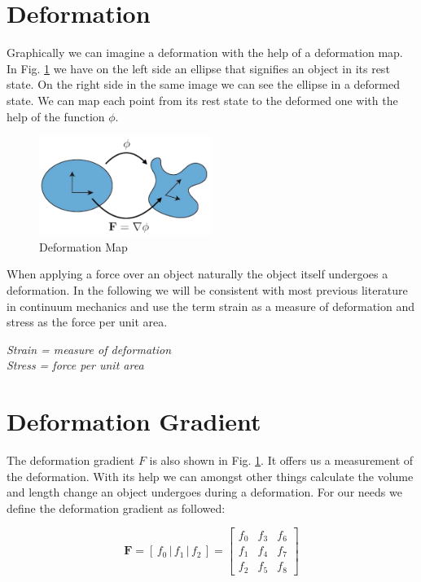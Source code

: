\section{Deformation}
Graphically we can imagine a deformation with the help of a deformation map. In Fig. \ref{fig:deformationmap} we have on the left side an ellipse that signifies an object in its rest state. On the right side in the same image we can see the ellipse in a deformed state. We can map each point from its rest state to the deformed one with the help of the function $\phi$.

\begin{figure}[!htbp]
	\centering
	\includegraphics[width=0.5\textwidth]{resources/deformation_map}
	\caption{Deformation Map {\cite{STREAM2018}}}
	\label{fig:deformationmap}
\end{figure}

When applying a force over an object naturally the object itself undergoes a deformation. In the following we will be consistent with most previous literature in continuum mechanics and use the term strain as a measure of deformation and stress as the force per unit area.

\begin{addmargin}[2cm]{2cm}
\textit{Strain = measure of deformation}  \\
\textit{Stress = force per unit area} 
\end{addmargin}


\section{Deformation Gradient}

The deformation gradient $F$ is also shown in Fig. \ref{fig:deformationmap}. It offers us a measurement of the deformation. With its help we can amongst other things calculate the volume and length change an object undergoes during a deformation.
For our needs we define the deformation gradient as followed:

\[
\textbf{F} = \left[ \,f_0\, \bigg| \,f_1\, \bigg| \,f_2\, \right] = \begin{bmatrix} f_0 & f_3 & f_6 \\ f_1 & f_4 & f_7 \\ f_2 & f_5 & f_8 \end{bmatrix}
\]


